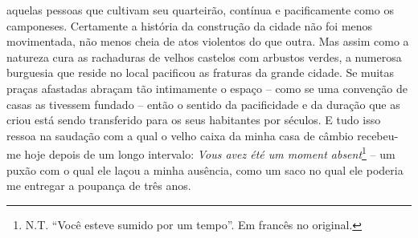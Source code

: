 aquelas pessoas que cultivam seu quarteirão, contínua e pacificamente
como os camponeses. Certamente a história da construção da cidade não
foi menos movimentada, não menos cheia de atos violentos do que outra.
Mas assim como a natureza cura as rachaduras de velhos castelos com
arbustos verdes, a numerosa burguesia que reside no local pacificou as
fraturas da grande cidade. Se muitas praças afastadas abraçam tão
intimamente o espaço -- como se uma convenção de casas as tivessem
fundado -- então o sentido da pacificidade e da duração que as criou
está sendo transferido para os seus habitantes por séculos. E tudo isso
ressoa na saudação com a qual o velho caixa da minha casa de câmbio
recebeu-me hoje depois de um longo intervalo: \emph{Vous avez été um
moment absent}\footnote{N.T. ``Você esteve sumido por um tempo''. Em
  francês no original.} -- um puxão com o qual ele laçou a minha
ausência, como um saco no qual ele poderia me entregar a poupança de
três anos.

